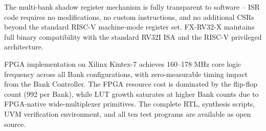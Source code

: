 \documentclass[letterpaper,journal]{IEEEtran}
\begin{document}
The multi-bank shadow register mechanism is fully transparent to software -- ISR code requires no modifications, no custom instructions, and no additional CSRs beyond the standard RISC-V machine-mode register set.
FX-RV32-X maintains full binary compatibility with the standard RV32I ISA and the RISC-V privileged architecture.

FPGA implementation on Xilinx Kintex-7 achieves 160--178 MHz core logic frequency across all Bank configurations, with zero-measurable timing impact from the Bank Controller.
The FPGA resource cost is dominated by the flip-flop count (992 per Bank), while LUT growth saturates at higher Bank counts due to FPGA-native wide-multiplexer primitives.
The complete RTL, synthesis scripts, UVM verification environment, and all ten test programs are available as open source.
\end{document}
